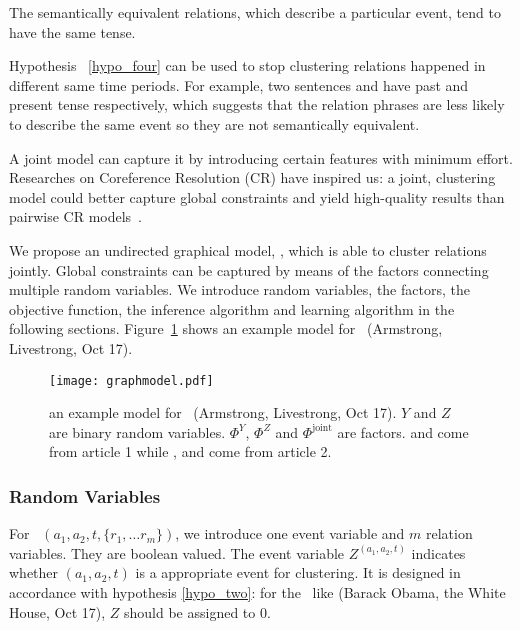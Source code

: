 \begin{hypothesis}
	\label{hypo_four}
The semantically equivalent relations, which describe a particular event, tend to have the same tense.
\end{hypothesis}

Hypothesis ~\ref{hypo_four} can be used to stop clustering relations happened in different same time periods. For example, two sentences  and  have past and present tense respectively, which suggests that the relation phrases are less likely to describe the same event so they are not semantically equivalent.

A joint model can capture it by introducing certain features with minimum effort. Researches on Coreference Resolution (CR) have inspired us: a joint, clustering model could better capture global constraints and yield high-quality results than pairwise CR models~\cite{rahman2009supervised}.

We propose an undirected graphical model, \sys, which is able to cluster relations jointly. Global constraints can be captured by means of the factors connecting multiple random variables. We introduce random variables, the factors, the objective function, the inference algorithm and learning algorithm in the following sections. Figure~\ref{graphmodel} shows an example model for \eec\ (Armstrong, Livestrong, Oct 17).
\begin{figure}
\centering
\texttt{[image: graphmodel.pdf]}
\caption{an example model for \eec\ (Armstrong, Livestrong, Oct 17). $Y$ and $Z$ are binary random variables. $\Phi^Y$, $\Phi^Z$ and $\Phi^{\text{joint}}$ are factors.  and  come from article 1 while ,  and  come from article 2.}
\label{graphmodel}
\end{figure}

\subsubsection{Random Variables}
For \bag\ $(a_1,a_2,t,\{r_1,\ldots r_m\})$, we introduce one event variable and $m$ relation variables. They are boolean valued. The event variable $Z^{(a_1,a_2,t)}$ indicates whether $(a_1,a_2,t)$ is a appropriate event for clustering. It is designed in accordance with hypothesis \ref{hypo_two}: for the \eec\ like (Barack Obama, the White House, Oct 17), $Z$ should be assigned to 0.

